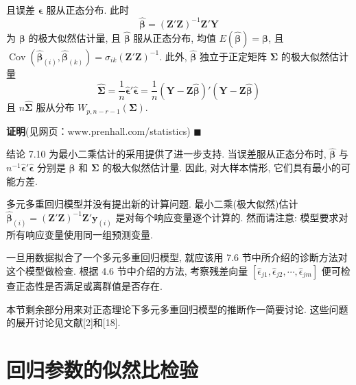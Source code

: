 
且误差 $\boldsymbol{\epsilon}$ 服从正态分布. 此时
\[
\hat{\boldsymbol{\beta}}=(\mathbf{Z}'\mathbf{Z})^{-1}\mathbf{Z}'\mathbf{Y}
\]
为 $\boldsymbol{\beta}$ 的极大似然估计量, 且 $\hat{\boldsymbol{\beta}}$ 服从正态分布, 均值 $E(\hat{\boldsymbol{\beta}})=\boldsymbol{\beta}$, 且 $\operatorname{Cov}(\hat{\boldsymbol{\beta}}_{(i)},\hat{\boldsymbol{\beta}}_{(k)})=\sigma_{ik}(\mathbf{Z}'\mathbf{Z})^{-1}$. 此外, $\hat{\boldsymbol{\beta}}$ 独立于正定矩阵 $\boldsymbol{\Sigma}$ 的极大似然估计量
\[
\hat{\boldsymbol{\Sigma}}=\frac{1}{n}\hat{\boldsymbol{\epsilon}}'\hat{\boldsymbol{\epsilon}}
=\frac{1}{n}(\mathbf{Y}-\mathbf{Z}\hat{\boldsymbol{\beta}})'(\mathbf{Y}-\mathbf{Z}\hat{\boldsymbol{\beta}})
\]
且 $n\hat{\boldsymbol{\Sigma}}$ 服从分布 $W_{p,n-r-1}(\boldsymbol{\Sigma})$.

\medskip
\noindent\textbf{证明}\quad (见网页：www.prenhall.com/statistics) \hfill$\blacksquare$

结论 7.10 为最小二乘估计的采用提供了进一步支持. 当误差服从正态分布时, $\hat{\boldsymbol{\beta}}$ 与 $n^{-1}\hat{\boldsymbol{\epsilon}}'\hat{\boldsymbol{\epsilon}}$ 分别是 $\boldsymbol{\beta}$ 和 $\boldsymbol{\Sigma}$ 的极大似然估计量. 因此, 对大样本情形, 它们具有最小的可能方差.

\quad 多元多重回归模型并没有提出新的计算问题. 最小二乘(极大似然)估计 $\hat{\boldsymbol{\beta}}_{(i)}=(\mathbf{Z}'\mathbf{Z})^{-1}\mathbf{Z}'\mathbf{y}_{(i)}$ 是对每个响应变量逐个计算的. 然而请注意: 模型要求对所有响应变量使用同一组预测变量.

一旦用数据拟合了一个多元多重回归模型, 就应该用 7.6 节中所介绍的诊断方法对这个模型做检查. 根据 4.6 节中介绍的方法, 考察残差向量 $[\hat{\epsilon}_{j1},\hat{\epsilon}_{j2},\cdots,\hat{\epsilon}_{jm}]$ 便可检查正态性是否满足或离群值是否存在.

本节剩余部分用来对正态理论下多元多重回归模型的推断作一简要讨论. 这些问题的展开讨论见文献[2]和[18].

\section{回归参数的似然比检验}
\label{sec:7.8}

